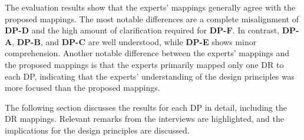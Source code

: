 The evaluation results show that the experts' mappings generally agree with the proposed mappings. The most notable differences are a complete misalignment of \textbf{DP-D} and the high amount of clarification required for \textbf{DP-F}. In contrast, \textbf{DP-A}, \textbf{DP-B}, and \textbf{DP-C} are well understood, while \textbf{DP-E} shows minor comprehension. Another notable difference between the experts' mappings and the proposed mappings is that the experts primarily mapped only one \ac{DR} to each \ac{DP}, indicating that the experts' understanding of the design principles was more focused than the proposed mappings.

The following section discusses the results for each \ac{DP} in detail, including the \ac{DR} mappings. Relevant remarks from the interviews are highlighted, and the implications for the design principles are discussed.

